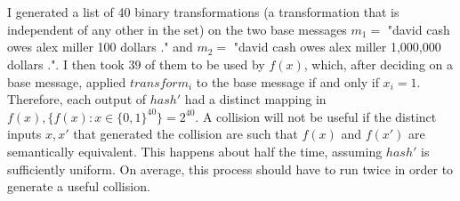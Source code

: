\documentclass[]{article}
\begin{document}
\section{}
I generated a list of 40 binary transformations (a transformation that is independent of any other in the set) on the two base messages $m_1 = $ "david cash owes alex miller 100 dollars ." and $m_2 = $ "david cash owes alex miller 1,000,000 dollars .". I then took $39$ of them to be used by $f(x)$, which, after deciding on a base message, applied $transform_i$ to the base message if and only if $x_i = 1$. Therefore, each output of $hash'$ had a distinct mapping in $f(x), \{f(x): x \in \{0,1\}^{40}\} = 2^{40}$. A collision will not be useful if the distinct inputs $x,x'$ that generated the collision are such that $f(x)$ and $f(x')$ are semantically equivalent. This happens about half the time, assuming $hash'$ is sufficiently uniform. On average, this process should have to run twice in order to generate a useful collision.
\end{document}
